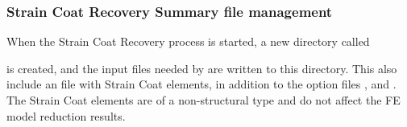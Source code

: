 \subsubsection{Strain Coat Recovery Summary file management}

When the Strain Coat Recovery process is started, a new directory called

\medskip
{}

\medskip\noindent
is created, and the input files needed by  are written to
this directory. This also include an  file with Strain Coat elements,
in addition to the option files ,  and .
The Strain Coat elements are of a non-structural type and do not
affect the FE model reduction results.

